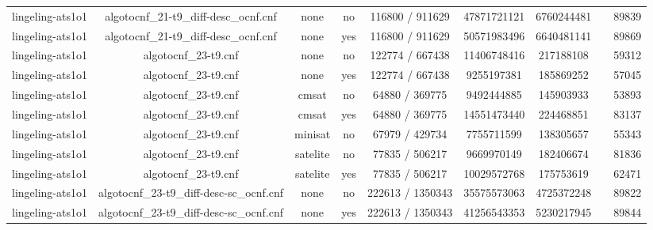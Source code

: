 \begin{appendices}
\begin{table}[p]
\begin{center}
\begin{tabular}{l|cccccccc}
  lingeling-ats1o1               & algotocnf\_21-t9\_diff-desc\_ocnf.cnf & none       & no    & 116800 / 911629 & 47871721121 & 6760244481 &            & 89839 \\ %
  lingeling-ats1o1               & algotocnf\_21-t9\_diff-desc\_ocnf.cnf & none       & yes   & 116800 / 911629 & 50571983496 & 6640481141 &            & 89869 \\ %
  lingeling-ats1o1               & algotocnf\_23-t9.cnf           & none       & no    & 122774 / 667438 & 11406748416 & 217188108 &            & 59312 \\ %
  lingeling-ats1o1               & algotocnf\_23-t9.cnf           & none       & yes   & 122774 / 667438 & 9255197381 & 185869252 &            & 57045 \\ %
  lingeling-ats1o1               & algotocnf\_23-t9.cnf           & cmsat      & no    & 64880 / 369775 & 9492444885 & 145903933 &            & 53893 \\ %
  lingeling-ats1o1               & algotocnf\_23-t9.cnf           & cmsat      & yes   & 64880 / 369775 & 14551473440 & 224468851 &            & 83137 \\ %
  lingeling-ats1o1               & algotocnf\_23-t9.cnf           & minisat    & no    & 67979 / 429734 & 7755711599 & 138305657 &            & 55343 \\ %
  lingeling-ats1o1               & algotocnf\_23-t9.cnf           & satelite   & no    & 77835 / 506217 & 9669970149 & 182406674 &            & 81836 \\ %
  lingeling-ats1o1               & algotocnf\_23-t9.cnf           & satelite   & yes   & 77835 / 506217 & 10029572768 & 175753619 &            & 62471 \\ %
  lingeling-ats1o1               & algotocnf\_23-t9\_diff-desc-sc\_ocnf.cnf & none       & no    & 222613 / 1350343 & 35575573063 & 4725372248 &            & 89822 \\ %
  lingeling-ats1o1               & algotocnf\_23-t9\_diff-desc-sc\_ocnf.cnf & none       & yes   & 222613 / 1350343 & 41256543353 & 5230217945 &            & 89844 \\ %

\end{tabular}
\end{center}
\end{table}
\end{appendices}
